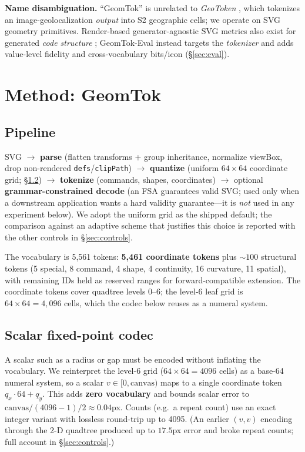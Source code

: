 \documentclass[11pt]{article}
\begin{document}
\textbf{Name disambiguation.} ``GeomTok'' is unrelated to \emph{GeoToken} \citep{ghasemi2025geotoken}, which tokenizes an image-geolocalization \emph{output} into S2 geographic cells; we operate on SVG geometry primitives. Render-based generator-agnostic SVG metrics also exist for generated \emph{code structure} \citep{zhu2026svgmetrics}; GeomTok-Eval instead targets the \emph{tokenizer} and adds value-level fidelity and cross-vocabulary bits/icon (\S\ref{sec:eval}).

\section{Method: GeomTok}
\label{sec:method}
\subsection{Pipeline}
SVG $\rightarrow$ \textbf{parse} (flatten transforms + group inheritance, normalize viewBox, drop non-rendered \texttt{defs}/\texttt{clipPath}) $\rightarrow$ \textbf{quantize} (uniform $64\times64$ coordinate grid; \S\ref{sec:codec}) $\rightarrow$ \textbf{tokenize} (commands, shapes, coordinates) $\rightarrow$ optional \textbf{grammar-constrained decode} (an FSA guarantees valid SVG; used only when a downstream application wants a hard validity guarantee---it is \emph{not} used in any experiment below). We adopt the uniform grid as the shipped default; the comparison against an adaptive scheme that justifies this choice is reported with the other controls in \S\ref{sec:controls}.

The vocabulary is 5{,}561 tokens: \textbf{5{,}461 coordinate tokens} plus ${\sim}100$ structural tokens (5 special, 8 command, 4 shape, 4 continuity, 16 curvature, 11 spatial), with remaining IDs held as reserved ranges for forward-compatible extension. The coordinate tokens cover quadtree levels 0--6; the level-6 leaf grid is $64\times64=4{,}096$ cells, which the codec below reuses as a numeral system.

\subsection{Scalar fixed-point codec}
\label{sec:codec}
A scalar such as a radius or gap must be encoded without inflating the vocabulary. We reinterpret the level-6 grid ($64\times64=4096$ cells) as a base-64 numeral system, so a scalar $v\in[0,\text{canvas})$ maps to a single coordinate token $q_x\cdot64+q_y$. This adds \textbf{zero vocabulary} and bounds scalar error to $\text{canvas}/(4096{-}1)/2\approx0.04$px. Counts (e.g.\ a repeat count) use an exact integer variant with lossless round-trip up to 4095. (An earlier $(v,v)$ encoding through the 2-D quadtree produced up to $17.5$px error and broke repeat counts; full account in \S\ref{sec:controls}.)
\end{document}
